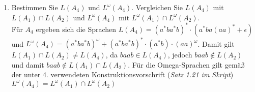 \documentclass[a4paper]{scrartcl}
\begin{document}
\begin{enumerate}[1.]
    \item Bestimmen Sie $L(A_4)$ und $L^{\omega}(A_4)$. Vergleichen Sie $L(A_4)$ mit 
        $L(A_1) \cap L(A_2)$ und $L^{\omega}(A_4)$ mit $L^{\omega}(A_1) \cap L^{\omega}(A_2)$. \\
        \newline
        Für $A_4$ ergeben sich die Sprachen $L(A_4) = (a^* b a^* b)^* \cdot (a^* b a (aa)^* + \epsilon)$ und $L^\omega (A_4) = (a^* b a^* b)^\omega + (a^* b a^* b)^* \cdot (a^*b) \cdot (aa)^\omega$. Damit gilt $L(A_1)\cap L(A_2)\neq L(A_4)$, da $baab\in L(A_4)$, jedoch $baab\notin L(A_2)$ und damit $baab\notin L(A_1)\cap L(A_2)$. Für die Omega-Sprachen gilt gemäß der unter 4. verwendeten Konstruktionsvorschrift (\textit{Satz 1.21 im Skript}) $L^{\omega}(A_4)=L^{\omega}(A_1)\cap L^{\omega}(A_2)$

\end{enumerate}
\end{document}
